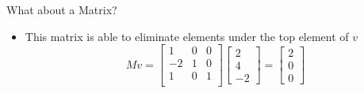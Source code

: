 \documentclass[10pt]{beamer}
\begin{document}
\begin{frame}{What about a Matrix?}

    \begin{itemize}
        \item This matrix is able to eliminate elements under the top element of $v$
     $$Mv=\begin{bmatrix}
          1 & 0 & 0\\
        -2 & 1 & 0\\
        1 & 0 & 1\\
        \end{bmatrix} \begin{bmatrix}2 \\ 4 \\ -2\end{bmatrix} =
        \begin{bmatrix}
        2 \\ 0 \\ 0
        \end{bmatrix}$$ 
     \end{itemize}
\end{frame}


\end{document}

